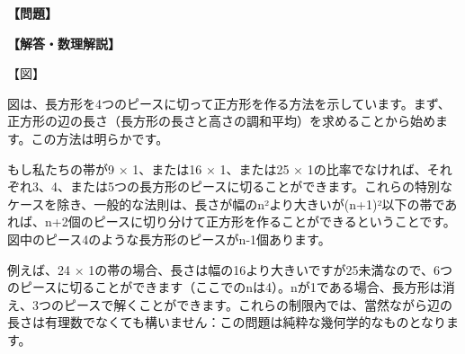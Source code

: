 \documentclass[10pt,a4paper,oneside,openany]{ltjsbook}
\begin{document}
\begin{tcolorbox}[colback=softblue,colframe=primaryblue,title=\textbf{第 153 問：切り取りパズル （原題: A CUTTING-OUT PUZZLE.）},arc=2mm,boxrule=1pt,breakable]
\textbf{【問題】}\par\vspace{0.3em}

\tcblower
\textbf{【解答・数理解説】}\par\vspace{0.3em}
【図】

図は、長方形を4つのピースに切って正方形を作る方法を示しています。まず、正方形の辺の長さ（長方形の長さと高さの調和平均）を求めることから始めます。この方法は明らかです。

もし私たちの帯が9 × 1、または16 × 1、または25 × 1の比率でなければ、それぞれ3、4、または5つの長方形のピースに切ることができます。これらの特別なケースを除き、一般的な法則は、長さが幅のn²より大きいが(n+1)²以下の帯であれば、n+2個のピースに切り分けて正方形を作ることができるということです。図中のピース4のような長方形のピースがn-1個あります。

例えば、24 × 1の帯の場合、長さは幅の16より大きいですが25未満なので、6つのピースに切ることができます（ここでのnは4）。nが1である場合、長方形は消え、3つのピースで解くことができます。これらの制限內では、當然ながら辺の長さは有理数でなくても構いません：この問題は純粋な幾何学的なものとなります。
\end{tcolorbox}
\end{document}
